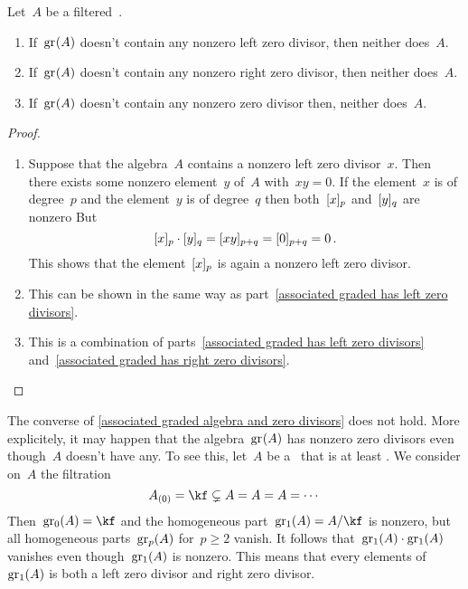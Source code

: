 \begin{proposition}
	\label{associated graded algebra and zero divisors}
	Let~$A$ be a filtered~{\algebra{$\kf$}}.
	\begin{enumerate}
		\item
			\label{associated graded has left zero divisors}
			If~$\gr(A)$ doesn’t contain any nonzero left zero divisor, then neither does~$A$.
		\item
			\label{associated graded has right zero divisors}
			If~$\gr(A)$ doesn’t contain any nonzero right zero divisor, then neither does~$A$.
		\item
			If~$\gr(A)$ doesn’t contain any nonzero zero divisor then, neither does~$A$.
	\end{enumerate}
\end{proposition}


\begin{proof}
	\leavevmode
	\begin{enumerate}
		\item
			Suppose that the algebra~$A$ contains a nonzero left zero divisor~$x$.
			Then there exists some nonzero element~$y$ of~$A$ with~$xy = 0$.
			If the element~$x$ is of degree~$p$ and the element~$y$ is of degree~$q$ then both~$\lbrack x\rbrack_p$ and~$\lbrack y\rbrack_q$ are nonzero
			But
			\[
				\lbrack x\rbrack_p \cdot \lbrack y\rbrack_q
				=
				\lbrack xy\rbrack_{p+q}
				=
				\lbrack 0 \rbrack_{p+q}
				=
				0 \,.
			\]
			This shows that the element~$\lbrack x\rbrack_p$ is again a nonzero left zero divisor.
		\item
			This can be shown in the same way as part~\ref*{associated graded has left zero divisors}.
		\item
			This is a combination of parts~\ref*{associated graded has left zero divisors} and~\ref*{associated graded has right zero divisors}.
		\qedhere
	\end{enumerate}
\end{proof}


\begin{remark}
	The converse of \cref{associated graded algebra and zero divisors} does not hold.
	More explicitely, it may happen that the algebra~$\gr(A)$ has nonzero zero divisors even though~$A$ doesn’t have any.
	To see this, let~$A$ be a~\algebra{$\kf$} that is at least {\twodimensional}.
	We consider on~$A$ the filtration
	\[
		A_{(0)}
		=
		\kf
		\subsetneq
		A
		=
		A
		=
		A
		=
		\dotsb
	\]
	Then~$\gr[0](A) = \kf$ and the homogeneous part~$\gr[1](A) = A / {\kf}$ is nonzero, but all homogeneous parts~$\gr[p](A)$ for~$p \geq 2$ vanish.
	It follows that~$\gr[1](A) \cdot \gr[1](A)$ vanishes even though~$\gr[1](A)$ is nonzero.
	This means that every elements of~$\gr[1](A)$ is both a left zero divisor and right zero divisor.
\end{remark}

